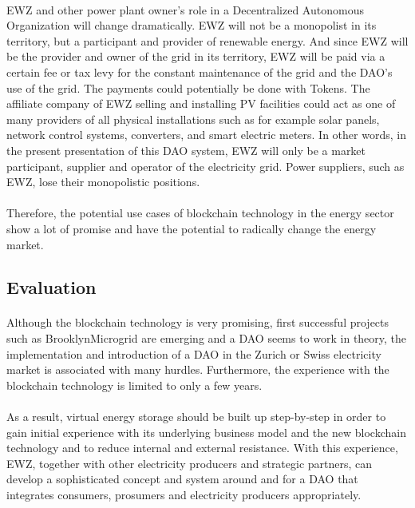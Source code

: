 \documentclass{scrartcl}
\begin{document}
	\paragraph{}
	EWZ and other power plant owner’s role in a Decentralized Autonomous Organization will change dramatically. EWZ will not be a monopolist in its territory, but a participant and provider of renewable energy. And since EWZ will be the provider and owner of the grid in its territory, EWZ will be paid via a certain fee or tax levy for the constant maintenance of the grid and the DAO's use of the grid. The payments could potentially be done with Tokens. The affiliate company of EWZ selling and installing PV facilities could act as one of many providers of all physical installations such as for example solar panels, network control systems, converters, and smart electric meters. In other words, in the present presentation of this DAO system, EWZ will only be a market participant, supplier and operator of the electricity grid. Power suppliers, such as EWZ, lose their monopolistic positions.
	
	\paragraph{}
	Therefore, the potential use cases of blockchain technology in the energy sector show a lot of promise and have the potential to radically change the energy market.
	
	\subsection{Evaluation}
	
	\paragraph{}
	Although the blockchain technology is very promising, first successful projects such as BrooklynMicrogrid are emerging and a DAO seems to work in theory, the implementation and introduction of a DAO in the Zurich or Swiss electricity market is associated with many hurdles. Furthermore, the experience with the blockchain technology is limited to only a few years.
	
	\paragraph{}
	As a result, virtual energy storage should be built up step-by-step in order to gain initial experience with its underlying business model and the new blockchain technology and to reduce internal and external resistance. With this experience, EWZ, together with other electricity producers and strategic partners, can develop a sophisticated concept and system around and for a DAO that integrates consumers, prosumers and electricity producers appropriately.
	
\end{document}
